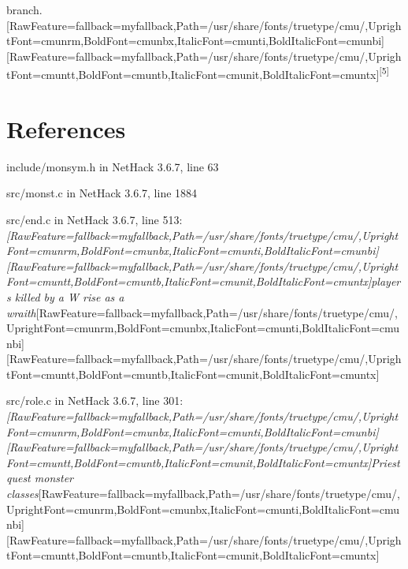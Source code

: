 branch.\allowbreak{}\setmainfont{cmunrm.ttf}[RawFeature={fallback=myfallback},Path=/usr/share/fonts/truetype/cmu/,UprightFont=cmunrm,BoldFont=cmunbx,ItalicFont=cmunti,BoldItalicFont=cmunbi]\setmonofont{cmunrm.ttf}[RawFeature={fallback=myfallback},Path=/usr/share/fonts/truetype/cmu/,UprightFont=cmuntt,BoldFont=cmuntb,ItalicFont=cmunit,BoldItalicFont=cmuntx]\textsuperscript{{$\text{[}$}5{$\text{]}$}} 

\section{References}
\label{12}

\begin{myenumerate}
\item{} include/monsym.h in NetHack 3.6.7, line 63\footnotemark[56]
     

\item{} src/monst.c in NetHack 3.6.7, line 1884\footnotemark[57]
     

\item{} src/end.c in NetHack 3.6.7, line 513\footnotemark[58]: {\itshape \allowbreak{}\setmainfont{cmunti.ttf}[RawFeature={fallback=myfallback},Path=/usr/share/fonts/truetype/cmu/,UprightFont=cmunrm,BoldFont=cmunbx,ItalicFont=cmunti,BoldItalicFont=cmunbi]\setmonofont{cmunti.ttf}[RawFeature={fallback=myfallback},Path=/usr/share/fonts/truetype/cmu/,UprightFont=cmuntt,BoldFont=cmuntb,ItalicFont=cmunit,BoldItalicFont=cmuntx]\itshape players killed by a W rise as a wraith}\allowbreak{}\setmainfont{cmunrm.ttf}[RawFeature={fallback=myfallback},Path=/usr/share/fonts/truetype/cmu/,UprightFont=cmunrm,BoldFont=cmunbx,ItalicFont=cmunti,BoldItalicFont=cmunbi]\setmonofont{cmunrm.ttf}[RawFeature={fallback=myfallback},Path=/usr/share/fonts/truetype/cmu/,UprightFont=cmuntt,BoldFont=cmuntb,ItalicFont=cmunit,BoldItalicFont=cmuntx]
     

\item{} src/role.c in NetHack 3.6.7, line 301\footnotemark[59]: {\itshape \allowbreak{}\setmainfont{cmunti.ttf}[RawFeature={fallback=myfallback},Path=/usr/share/fonts/truetype/cmu/,UprightFont=cmunrm,BoldFont=cmunbx,ItalicFont=cmunti,BoldItalicFont=cmunbi]\setmonofont{cmunti.ttf}[RawFeature={fallback=myfallback},Path=/usr/share/fonts/truetype/cmu/,UprightFont=cmuntt,BoldFont=cmuntb,ItalicFont=cmunit,BoldItalicFont=cmuntx]\itshape Priest quest monster classes}\allowbreak{}\setmainfont{cmunrm.ttf}[RawFeature={fallback=myfallback},Path=/usr/share/fonts/truetype/cmu/,UprightFont=cmunrm,BoldFont=cmunbx,ItalicFont=cmunti,BoldItalicFont=cmunbi]\setmonofont{cmunrm.ttf}[RawFeature={fallback=myfallback},Path=/usr/share/fonts/truetype/cmu/,UprightFont=cmuntt,BoldFont=cmuntb,ItalicFont=cmunit,BoldItalicFont=cmuntx]
     


\end{myenumerate}
